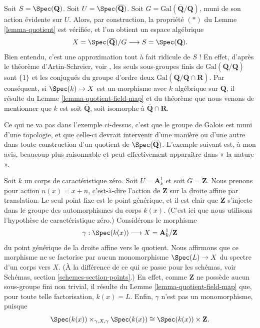 \begin{example}
\label{example-Qbar}
Soit $S = \Spec(\mathbf{Q})$.
Soit $U = \Spec(\overline{\mathbf{Q}})$.
Soit $G = \text{Gal}(\overline{\mathbf{Q}}/\mathbf{Q})$, muni de son action
évidente sur $U$. Alors, par construction, la propriété $(*)$ du
Lemme \ref{lemma-quotient} est vérifiée, et l'on obtient un espace algébrique
$$
X = \Spec(\overline{\mathbf{Q}})/G
\longrightarrow
S = \Spec(\mathbf{Q}).
$$
Bien entendu, c'est une approximation tout à fait ridicule de $S$ !
En effet, d'après le théorème d'Artin-Schreier,
voir \cite[Théorème 17, page 316]{JacobsonIII},
les seuls sous-groupes finis de $\text{Gal}(\overline{\mathbf{Q}}/\mathbf{Q})$
sont $\{1\}$ et les conjugués du groupe d'ordre deux
$\text{Gal}(\overline{\mathbf{Q}}/\overline{\mathbf{Q}} \cap \mathbf{R})$.
Par conséquent, si
$\Spec(k) \to X$ est un morphisme avec $k$ algébrique sur $\mathbf{Q}$,
il résulte du Lemme \ref{lemma-quotient-field-map} et du théorème
que nous venons de mentionner que $k$ est soit $\overline{\mathbf{Q}}$, soit isomorphe à
$\overline{\mathbf{Q}} \cap \mathbf{R}$.
\end{example}

\noindent
Ce qui ne va pas dans l'exemple ci-dessus, c'est que
le groupe de Galois est muni d'une topologie,
et que celle-ci devrait intervenir d'une manière ou d'une autre dans toute construction
d'un quotient de $\Spec(\overline{\mathbf{Q}})$.
L'exemple suivant est, à mon avis, beaucoup plus raisonnable
et peut effectivement apparaître dans « la nature ».

\begin{example}
\label{example-affine-line-translation}
Soit $k$ un corps de caractéristique zéro.
Soit $U = \mathbf{A}^1_k$ et soit $G = \mathbf{Z}$.
Nous prenons pour action $n(x) = x + n$, c'est-à-dire l'action de
$\mathbf{Z}$ sur la droite affine par translation.
Le seul point fixe est le point générique, et il
est clair que $\mathbf{Z}$ s'injecte dans
le groupe des automorphismes du corps $k(x)$. (C'est
ici que nous utilisons l'hypothèse de caractéristique zéro.)
Considérons le morphisme
$$
\gamma : \Spec(k(x)) \longrightarrow X = \mathbf{A}^1_k/\mathbf{Z}
$$
du point générique de la droite affine vers le quotient.
Nous affirmons que ce morphisme ne se factorise par aucun
monomorphisme $\Spec(L) \to X$ du spectre d'un
corps vers $X$. (À la différence de ce qui se passe pour les schémas, voir
Schémas, section \ref{schemes-section-points}.) En effet, comme
$\mathbf{Z}$ ne possède aucun sous-groupe fini non trivial, il résulte du
Lemme \ref{lemma-quotient-field-map} que, pour toute telle
factorisation, $k(x) = L$. Enfin, $\gamma$ n'est pas un monomorphisme,
puisque
$$
\Spec(k(x)) \times_{\gamma, X, \gamma} \Spec(k(x))
\cong
\Spec(k(x)) \times \mathbf{Z}.
$$
\end{example}

